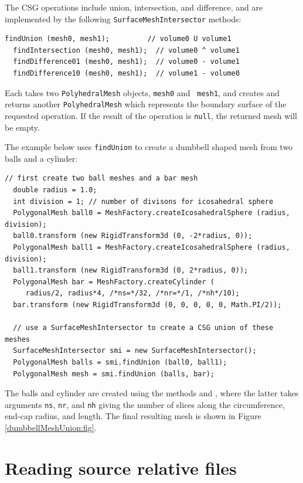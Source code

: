 The CSG operations include union, intersection, and difference, and
are implemented by the following {\tt SurfaceMeshIntersector} methods:
%
\begin{lstlisting}[]
  findUnion (mesh0, mesh1);         // volume0 U volume1
  findIntersection (mesh0, mesh1);  // volume0 ^ volume1
  findDifference01 (mesh0, mesh1);  // volume0 - volume1 
  findDifference10 (mesh0, mesh1);  // volume1 - volume0 
\end{lstlisting}
%
Each takes two {\tt PolyhedralMesh} objects, {\tt mesh0} and {\tt
mesh1}, and creates and returns another {\tt PolyhedralMesh} which
represents the boundary surface of the requested operation. If the
result of the operation is {\tt null}, the returned mesh will be empty.

The example below uses {\tt findUnion} to create a dumbbell shaped mesh
from two balls and a cylinder:
%
\begin{lstlisting}[]
  // first create two ball meshes and a bar mesh
  double radius = 1.0;
  int division = 1; // number of divisons for icosahedral sphere
  PolygonalMesh ball0 = MeshFactory.createIcosahedralSphere (radius, division);
  ball0.transform (new RigidTransform3d (0, -2*radius, 0));
  PolygonalMesh ball1 = MeshFactory.createIcosahedralSphere (radius, division);
  ball1.transform (new RigidTransform3d (0, 2*radius, 0));
  PolygonalMesh bar = MeshFactory.createCylinder (
     radius/2, radius*4, /*ns=*/32, /*nr=*/1, /*nh*/10);
  bar.transform (new RigidTransform3d (0, 0, 0, 0, 0, Math.PI/2));

  // use a SurfaceMeshIntersector to create a CSG union of these meshes
  SurfaceMeshIntersector smi = new SurfaceMeshIntersector();
  PolygonalMesh balls = smi.findUnion (ball0, ball1);
  PolygonalMesh mesh = smi.findUnion (balls, bar);
\end{lstlisting}
%
The balls and cylinder are created using the
 methods
and
,
where the latter takes arguments {\tt ns}, {\tt nr}, and {\tt nh}
giving the number of slices along the circumference, end-cap radius,
and length. The final resulting mesh is shown in Figure
\ref{dumbbellMeshUnion:fig}.

\section{Reading source relative files}
\label{PathFinder:sec}

